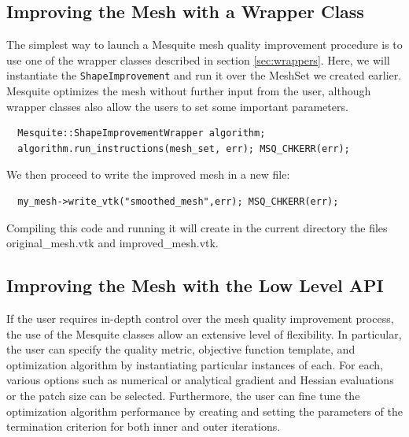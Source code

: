 \documentclass[letter]{report}
\begin{document}
\subsection{Improving the Mesh with a Wrapper Class}
The simplest way to launch a Mesquite mesh quality improvement procedure is to use one of the
wrapper classes described in section \ref{sec:wrappers}. Here, we will instantiate the
\texttt{ShapeImprovement} and run it over the MeshSet we created earlier. Mesquite
optimizes the mesh without further input from the user, although wrapper classes also allow the
users to set some important parameters.
\begin{verbatim}
  Mesquite::ShapeImprovementWrapper algorithm;
  algorithm.run_instructions(mesh_set, err); MSQ_CHKERR(err);
\end{verbatim}
We then proceed to write the improved mesh in a new file:
\begin{verbatim}
  my_mesh->write_vtk("smoothed_mesh",err); MSQ_CHKERR(err);
\end{verbatim}
Compiling this code and running it will create in the current directory the files original\_mesh.vtk
and improved\_mesh.vtk. 

\subsection{Improving the Mesh with the Low Level API}

If the user requires in-depth control over the mesh quality improvement
process, the use of the Mesquite classes allow an extensive
level of flexibility.   In particular, the user can specify the quality
metric, objective function template, and optimization algorithm by
instantiating particular instances of each.  For each, various options
such as numerical or analytical gradient and Hessian evaluations or
the patch size can be selected.  Furthermore, the user can fine tune
the optimization algorithm performance by creating and setting the parameters 
of the termination criterion for both inner and outer iterations.
\end{document}

